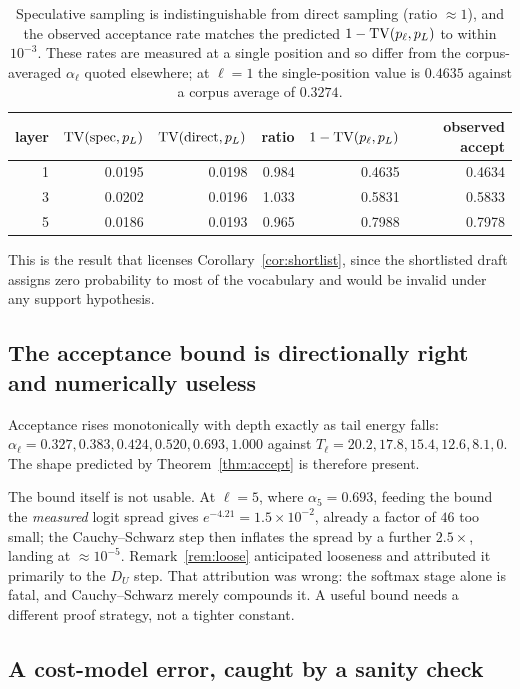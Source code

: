 \begin{table}[h]
\centering
\begin{tabular}{rrrrrr}
\toprule
layer & $\mathrm{TV}(\text{spec},p_L)$ & $\mathrm{TV}(\text{direct},p_L)$ & ratio
      & $1-\mathrm{TV}(p_\ell,p_L)$ & observed accept \\
\midrule
1 & 0.0195 & 0.0198 & 0.984 & 0.4635 & 0.4634 \\
3 & 0.0202 & 0.0196 & 1.033 & 0.5831 & 0.5833 \\
5 & 0.0186 & 0.0193 & 0.965 & 0.7988 & 0.7978 \\
\bottomrule
\end{tabular}
\caption{Speculative sampling is indistinguishable from direct sampling
(ratio $\approx 1$), and the observed acceptance rate matches the predicted
$1-\mathrm{TV}(p_\ell,p_L)$ to within $10^{-3}$. These rates are measured at a single
position and so differ from the corpus-averaged $\alpha_\ell$ quoted elsewhere;
at $\ell=1$ the single-position value is $0.4635$ against a corpus average of
$0.3274$.}
\label{tab:exact}
\end{table}

This is the result that licenses Corollary~\ref{cor:shortlist}, since the
shortlisted draft assigns zero probability to most of the vocabulary and would be
invalid under any support hypothesis.

\subsection{The acceptance bound is directionally right and numerically useless}

Acceptance rises monotonically with depth exactly as tail energy falls:
$\alpha_\ell = 0.327, 0.383, 0.424, 0.520, 0.693, 1.000$ against
$T_\ell = 20.2, 17.8, 15.4, 12.6, 8.1, 0$. The shape predicted by
Theorem~\ref{thm:accept} is therefore present.

The bound itself is not usable. At $\ell=5$, where $\alpha_5 = 0.693$, feeding
the bound the \emph{measured} logit spread gives $e^{-4.21} = 1.5\times10^{-2}$,
already a factor of $46$ too small; the Cauchy--Schwarz step then inflates the
spread by a further $2.5\times$, landing at $\approx 10^{-5}$.
Remark~\ref{rem:loose} anticipated looseness and attributed it primarily to the
$D_U$ step. That attribution was wrong: the softmax stage alone is fatal, and
Cauchy--Schwarz merely compounds it. A useful bound needs a different proof
strategy, not a tighter constant.

\subsection{A cost-model error, caught by a sanity check}
\label{sec:exp-cost}

